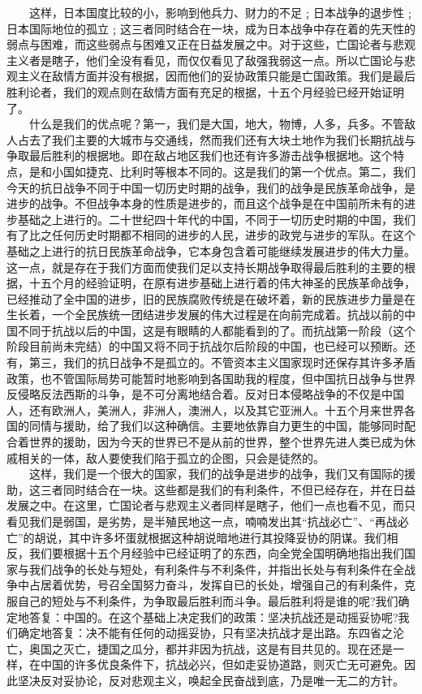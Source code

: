 \documentclass[cn,11pt,chinese]{elegantbook}
\begin{document}
　　这样，日本国度比较的小，影响到他兵力、财力的不足﹔日本战争的退步性﹔日本国际地位的孤立﹔这三者同时结合在一块，成为日本战争中存在着的先天性的弱点与困难，而这些弱点与困难又正在日益发展之中。对于这些，亡国论者与悲观主义者是瞎子，他们全没有看见，而仅仅看见了敌强我弱这一点。所以亡国论与悲观主义在敌情方面并没有根据，因而他们的妥协政策只能是亡国政策。我们是最后胜利论者，我们的观点则在敌情方面有充足的根据，十五个月经验已经开始证明了。\\
　　什么是我们的优点呢？第一，我们是大国，地大，物博，人多，兵多。不管敌人占去了我们主要的大城市与交通线，然而我们还有大块土地作为我们长期抗战与争取最后胜利的根据地。即在敌占地区我们也还有许多游击战争根据地。这个特点，是和小国如捷克、比利时等根本不同的。这是我们的第一个优点。第二，我们今天的抗日战争不同于中国一切历史时期的战争，我们的战争是民族革命战争，是进步的战争。不但战争本身的性质是进步的，而且这个战争是在中国前所未有的进步基础之上进行的。二十世纪四十年代的中国，不同于一切历史时期的中国，我们有了比之任何历史时期都不相同的进步的人民，进步的政党与进步的军队。在这个基础之上进行的抗日民族革命战争，它本身包含着可能继续发展进步的伟大力量。这一点，就是存在于我们方面而使我们足以支持长期战争取得最后胜利的主要的根据，十五个月的经验证明，在原有进步基础上进行着的伟大神圣的民族革命战争，已经推动了全中国的进步，旧的民族腐败传统是在破坏着，新的民族进步力量是在生长着，一个全民族统一团结进步发展的伟大过程是在向前完成着。抗战以前的中国不同于抗战以后的中国，这是有眼睛的人都能看到的了。而抗战第一阶段（这个阶段目前尚未完结）的中国又将不同于抗战尔后阶段的中国，也已经可以预断。还有，第三，我们的抗日战争不是孤立的。不管资本主义国家现时还保存其许多矛盾政策，也不管国际局势可能暂时地影响到各国助我的程度，但中国抗日战争与世界反侵略反法西斯的斗争，是不可分离地结合着。反对日本侵略战争的不仅是中国人，还有欧洲人，美洲人，非洲人，澳洲人，以及其它亚洲人。十五个月来世界各国的同情与援助，给了我们以这种确信。主要地依靠自力更生的中国，能够同时配合着世界的援助，因为今天的世界已不是从前的世界，整个世界先进人类已成为休戚相关的一体，敌人要使我们陷于孤立的企图，只会是徒然的。\\
　　这样，我们是一个很大的国家，我们的战争是进步的战争，我们又有国际的援助，这三者同时结合在一块。这些都是我们的有利条件，不但已经存在，并在日益发展之中。在这里，亡国论者与悲观主义者同样是瞎子，他们一点也看不见，而只看见我们是弱国，是劣势，是半殖民地这一点，喃喃发出其“抗战必亡”、“再战必亡”的胡说，其中许多坏蛋就根据这种胡说暗地进行其投降妥协的阴谋。我们相反，我们要根据十五个月经验中已经证明了的东西，向全党全国明确地指出我们国家与我们战争的长处与短处，有利条件与不利条件，并指出长处与有利条件在全战争中占居着优势，号召全国努力奋斗，发挥自已的长处，增强自己的有利条件，克服自己的短处与不利条件，为争取最后胜利而斗争。最后胜利将是谁的呢?我们确定地答复：中国的。在这个基础上决定我们的政策：坚决抗战还是动摇妥协呢?我们确定地答复：决不能有任何的动摇妥协，只有坚决抗战才是出路。东四省之沦亡，奥国之灭亡，捷国之瓜分，都并非因为抗战，这是有目共见的。现在还是一样，在中国的许多优良条件下，抗战必兴，但如走妥协道路，则灭亡无可避免。因此坚决反对妥协论，反对悲观主义，唤起全民奋战到底，乃是唯一无二的方针。\\
\end{document}
